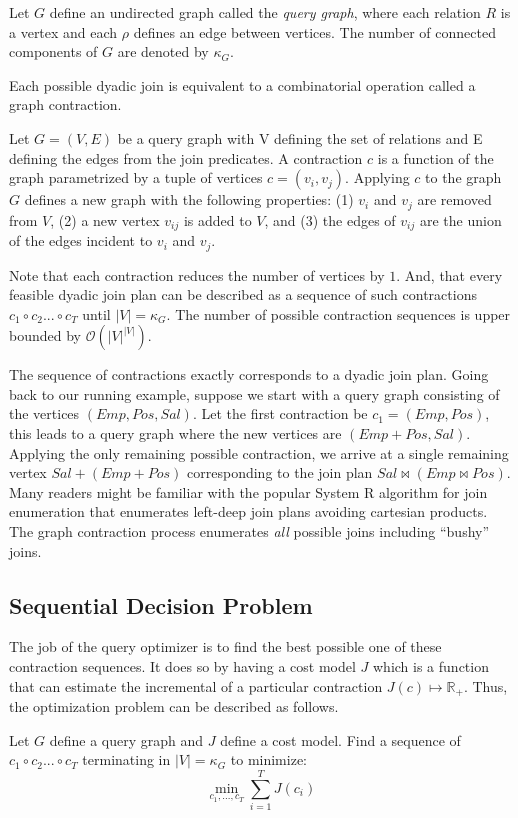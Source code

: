 \begin{definition}
Let $G$ define an undirected graph called the \emph{query graph}, where each relation $R$ is a vertex and each $\rho$ defines an edge between vertices. The number of connected components of $G$ are denoted by $\kappa_G$.
\end{definition}

Each possible dyadic join is equivalent to a combinatorial operation called a graph contraction.

\begin{definition}[Contraction]
Let $G = (V,E)$ be a query graph with V defining the set of relations and E defining the edges from the join predicates. A contraction $c$ is a function of the graph parametrized by a tuple of vertices $c=(v_i, v_j)$. Applying $c$ to the graph $G$ defines a new graph with the following properties: (1) $v_i$ and $v_j$ are removed from $V$, (2) a new vertex $v_{ij}$ is added to $V$, and (3) the edges of $v_{ij}$ are the union of the edges incident to $v_i$ and $v_j$. 
\end{definition}

Note that each contraction reduces the number of vertices by $1$. And, that every feasible dyadic join plan can be described as a sequence of such contractions $c_1 \circ c_2 ...\circ c_{T}$ until $|V| = \kappa_G$. The number of possible contraction sequences is upper bounded by $\mathcal{O}(|V|^{|V|})$. 

The sequence of contractions exactly corresponds to a dyadic join plan. Going back to our running example, suppose we start with a query graph consisting of the vertices $(Emp, Pos, Sal)$. Let the first contraction be $c_1 = (Emp, Pos)$, this leads to a query graph where the new vertices are $(Emp+Pos, Sal)$. Applying the only remaining possible contraction, we arrive at a single remaining vertex $Sal+(Emp+Pos)$ corresponding to the join plan $Sal \bowtie (Emp \bowtie Pos)$. Many readers might be familiar with the popular System R algorithm for join enumeration that enumerates left-deep join plans avoiding cartesian products. The graph contraction process enumerates \emph{all} possible joins including ``bushy'' joins.

\subsection{Sequential Decision Problem}
The job of the query optimizer is to find the best possible one of these contraction sequences. It does so by having a cost model $J$ which is a function that can estimate the incremental of a particular contraction $J(c) \mapsto \mathbb{R}_+$. Thus, the optimization problem can be described as follows.

\begin{problem}
Let $G$ define a query graph and $J$ define a cost model. Find a sequence of $c_1 \circ c_2 ...\circ c_{T}$ terminating in $|V| = \kappa_G$ to minimize:
\[
\min_{c_1,...,c_T} \sum_{i=1}^T J(c_i)
\]
\end{problem}